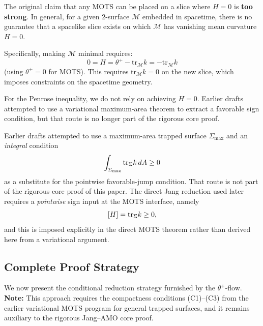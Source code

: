 \begin{remark}[Limitation: Cannot Generally Make $H = 0$]
The original claim that any MOTS can be placed on a slice where $H = 0$ is \textbf{too strong}. In general, for a given 2-surface $\mathcal{M}$ embedded in spacetime, there is no guarantee that a spacelike slice exists on which $\mathcal{M}$ has vanishing mean curvature $H = 0$.

Specifically, making $\mathcal{M}$ minimal requires:
\begin{equation}
0 = H = \theta^+ - \mathrm{tr}_{\mathcal{M}} k = -\mathrm{tr}_{\mathcal{M}} k
\end{equation}
(using $\theta^+ = 0$ for MOTS). This requires $\mathrm{tr}_{\mathcal{M}} k = 0$ on the new slice, which imposes constraints on the spacetime geometry.

For the Penrose inequality, we do not rely on achieving $H = 0$. Earlier drafts attempted to use a variational maximum-area theorem to extract a favorable sign condition, but that route is no longer part of the rigorous core proof.
\end{remark}

\begin{remark}
\label{cor:reduction-favorable}
Earlier drafts attempted to use a maximum-area trapped surface $\Sigma_{\max}$ and an \emph{integral} condition
\[
    \int_{\Sigma_{\max}} \mathrm{tr}_\Sigma k \, dA \ge 0
\]
as a substitute for the pointwise favorable-jump condition. That route is not part of the rigorous core proof of this paper. The direct Jang reduction used later requires a \emph{pointwise} sign input at the MOTS interface, namely
\[
    [H] = \mathrm{tr}_\Sigma k \ge 0,
\]
and this is imposed explicitly in the direct MOTS theorem rather than derived here from a variational argument.
\end{remark}

\subsection{Complete Proof Strategy}
\label{subsec:complete-strategy}

We now present the conditional reduction strategy furnished by the $\theta^+$-flow. \textbf{Note:} This approach requires the compactness conditions (C1)--(C3) from the earlier variational MOTS program for general trapped surfaces, and it remains auxiliary to the rigorous Jang--AMO core proof.

